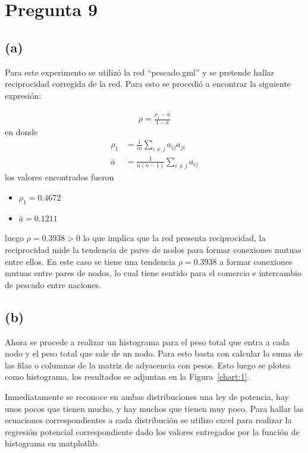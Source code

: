 \documentclass[letterpaper]{article}
\begin{document}
\section{Pregunta 9}

\subsection*{(a)}
Para este experimento se utilizó la red ``pescado.gml'' y se pretende hallar reciprocidad corregida de la red. Para esto se procedió a encontrar la siguiente expresión:

\begin{align}
  \rho = \frac{\rho_1 - \bar{a}}{1 - \bar{a}}
\end{align}
en donde
\begin{align}
  \rho_1 &= \frac{1}{m}\sum_{i \neq j} a_{ij}a_{ji} \\
  \bar{a} &= \frac{1}{n(n-1)}\sum_{i \neq j} a_{ij}
\end{align}
los valores encontrados fueron
\begin{itemize}
  \item $\rho_1  =  0.4672$
  \item $\bar{a} = 0.1211$
\end{itemize}
luego $\rho = 0.3938 > 0$ lo que implica que la red presenta reciprocidad, la reciprocidad mide la tendencia de pares de nodos para formar conexiones mutuas entre ellos. En este caso se tiene una tendencia $\rho = 0.3938$ a formar conexiones mutuas entre pares de nodos, lo cual tiene sentido para el comercio e intercambio de pescado entre naciones.

\subsection*{(b)}
Ahora se procede a realizar un histograma para el peso total que entra a cada nodo y el peso total que sale de un nodo. Para esto basta con calcular la suma de las filas o columnas de la matriz de adyacencia con pesos. Esto luego se plotea como histograma, los resultados se adjuntan en la Figura~\ref{chart:1}.

Inmediatamente se reconoce en ambas distribuciones una ley de potencia, hay unos pocos que tienen mucho, y hay muchos que tienen muy poco. Para hallar las ecuaciones correspondientes a cada distribución se utilizo excel para realizar la regresión potencial correspondiente dado los valores entregados por la función de histograma en matplotlib.
\end{document}
